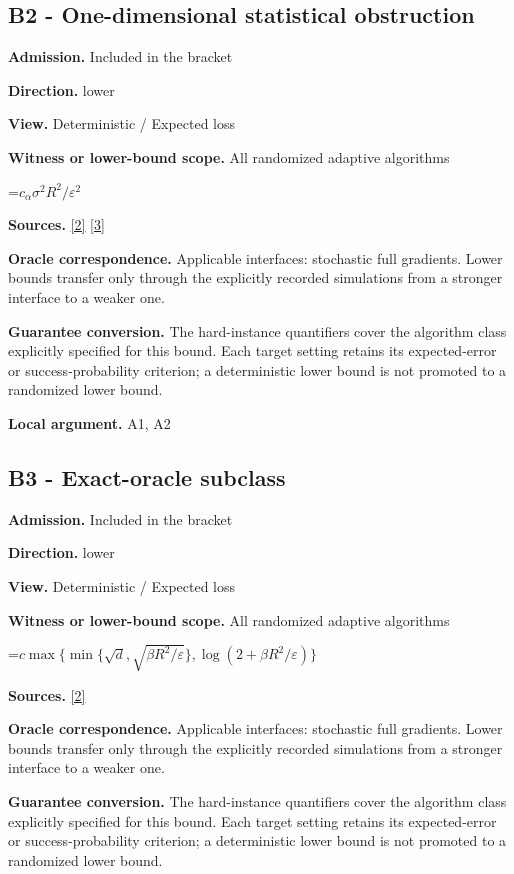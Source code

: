 \documentclass[10pt,a4paper]{article}
\newcommand{\AtlasMath}[1]{\par\begingroup\centering\setbox0=\hbox{$\displaystyle #1$}\ifdim\wd0>1.4\linewidth\typeout{ATLAS WIDE FORMULA: \the\wd0}\fi\ifdim\wd0>\linewidth\resizebox{\linewidth}{!}{\box0}\else\box0\fi\par\endgroup}
\begin{document}
\subsection{B2 - One-dimensional statistical obstruction}
\textbf{Admission.} Included in the bracket

\textbf{Direction.} lower

\textbf{View.} Deterministic / Expected loss

\textbf{Witness or lower-bound scope.} All randomized adaptive algorithms

\AtlasMath{c_\alpha \sigma^2R^2/\varepsilon^2}
\textbf{Sources.} \href{https://arxiv.org/pdf/2609.10874}{[2]} \href{https://proceedings.mlr.press/v202/sadiev23a/sadiev23a.pdf}{[3]}

\textbf{Oracle correspondence.} Applicable interfaces: stochastic full gradients. Lower bounds transfer only through the explicitly recorded simulations from a stronger interface to a weaker one.

\textbf{Guarantee conversion.} The hard-instance quantifiers cover the algorithm class explicitly specified for this bound. Each target setting retains its expected-error or success-probability criterion; a deterministic lower bound is not promoted to a randomized lower bound.

\textbf{Local argument.} A1, A2

\subsection{B3 - Exact-oracle subclass}
\textbf{Admission.} Included in the bracket

\textbf{Direction.} lower

\textbf{View.} Deterministic / Expected loss

\textbf{Witness or lower-bound scope.} All randomized adaptive algorithms

\AtlasMath{c\max\{\min\{\sqrt d,\sqrt{\beta R^2/\varepsilon}\},\log(2+\beta R^2/\varepsilon)\}}
\textbf{Sources.} \href{https://arxiv.org/pdf/2609.10874}{[2]}

\textbf{Oracle correspondence.} Applicable interfaces: stochastic full gradients. Lower bounds transfer only through the explicitly recorded simulations from a stronger interface to a weaker one.

\textbf{Guarantee conversion.} The hard-instance quantifiers cover the algorithm class explicitly specified for this bound. Each target setting retains its expected-error or success-probability criterion; a deterministic lower bound is not promoted to a randomized lower bound.
\end{document}
